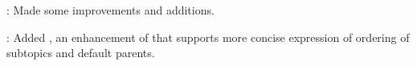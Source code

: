 
\begin{frame}

\implibtitle

:
Made some improvements and additions.

\separation

:
Added , an enhancement of 
that supports more concise expression of
ordering of subtopics and default parents.

\end{frame}



